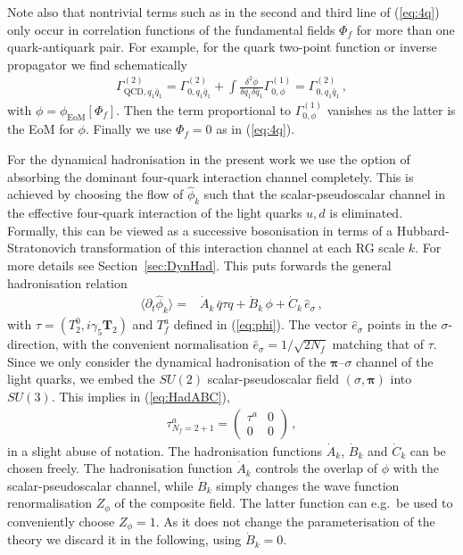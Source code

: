 \documentclass[%
reprint,
superscriptaddress,
showpacs,preprintnumbers,
 amsmath,amssymb,
 aps,
prd,
]{revtex4-1}
\def\eq#1{(\ref{#1})}
\def\sec#1{Section~\ref{#1}}
\begin{document}
Note also that nontrivial terms such as in the second and third line
of \eq{eq:4q} only occur in correlation functions of the fundamental
fields $\Phi_f$ for more than one quark-antiquark pair. For example,
for the quark two-point function or inverse propagator we find
schematically
%
\begin{align}
  \Gamma^{(2)}_{\textrm{QCD}, q_1 \bar q_1}=
  \Gamma^{(2)}_{0, q_1 \bar q_1}+\int \frac{\delta^2\phi}{\delta q_1
  \delta \bar q_1 }
  \Gamma^{(1)}_{0, \phi}
  =
  \Gamma^{(2)}_{0, q_1 \bar q_1}\,,
  \label{eq:qbarq} \end{align}
%
with $\phi=\phi_\textrm{EoM}[\Phi_f]$. Then the term proportional to
$\Gamma^{(1)}_{0,\phi}$ vanishes as the latter is the EoM for $\phi$.
Finally we use $\Phi_f=0$ as in \eq{eq:4q}.

For the dynamical hadronisation in the present work we use the option
of absorbing the dominant four-quark interaction channel
completely. This is achieved by choosing the flow of $\hat\phi_k$ such
that the scalar-pseudoscalar channel in the effective four-quark
interaction of the light quarks $u,d$ is eliminated. Formally, this
can be viewed as a successive bosonisation in terms of a
Hubbard-Stratonovich transformation of this interaction channel at
each RG scale $k$. For more details see \sec{sec:DynHad}. This puts
forwards the general hadronisation relation
%
\begin{align}\label{eq:HadABC}
  \langle   \partial_t \hat \phi_k\rangle =&\dot{A}_k \,\bar{q}\tau q
                                             +\dot{B}_k
                                             \,\phi +\dot{C}_k \,\hat e_\sigma\,,  
\end{align}
%
with $\tau=(T_2^0, i \gamma_5 \bm{T}_2)$ and $T_f^a$ defined in
\eq{eq:phi}. The vector $\hat e_\sigma$ points in the
$\sigma$-direction, with the convenient normalisation
$\hat e_\sigma=1/\sqrt{2 N_f}$ matching that of $\tau$. Since we only
consider the dynamical hadronisation of the $\bm\pi$--$\sigma$
channel of the light quarks, we embed the $SU(2)$ scalar-pseudoscalar
field $(\sigma,\bm\pi)$ into $SU(3)$. This implies in
\eq{eq:HadABC},
%
\begin{align}\label{eq:SU3embed}
  \tau^{a}_{N_f=2+1} = \begin{pmatrix}\tau^a
    & 0 \\[1ex] 0 & 0\end{pmatrix}\,,
\end{align}
%
in a slight abuse of notation. The hadronisation functions
$\dot{A}_k$, $\dot{B}_k$ and $\dot{C}_k$ can be chosen freely. The
hadronisation function $\dot{A}_k$ controls the overlap of $\phi$ with
the scalar-pseudoscalar channel, while $\dot{B}_k$ simply changes the
wave function renormalisation $Z_\phi$ of the composite field. The
latter function can e.g.\ be used to conveniently choose
$Z_\phi=1$. As it does not change the parameterisation of the theory
we discard it in the following, using $\dot{B}_k=0$.
\end{document}
